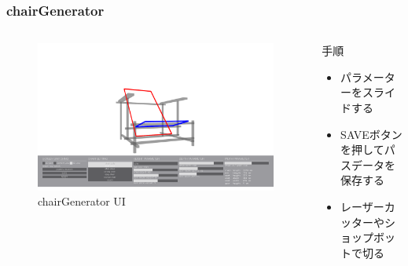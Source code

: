 \documentclass[10pt, dvipdfmx]{beamer}
\begin{document}
        \begin{frame}
            \frametitle{chairGenerator}
            \tiny
            \begin{columns}[c]
                \begin{column}{0.50\textwidth}
                    \begin{figure}[htb]
                        \includegraphics[width=\columnwidth]{images/03.png}
                        \caption{chairGenerator UI}
                        \label{fig:01}
                    \end{figure}
                \end{column}
                \begin{column}{0.50\textwidth}
                    \begin{block}{手順}
                        \begin{itemize}
                            \item パラメーターをスライドする
                            \item SAVEボタンを押してパスデータを保存する
                            \item レーザーカッターやショップボットで切る
                        \end{itemize}
                    \end{block}
                \end{column}
            \end{columns}
        \end{frame}
\end{document}
